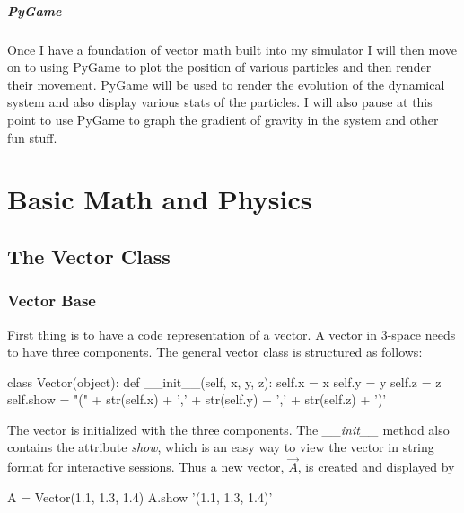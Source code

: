 \documentclass[15pt]{report}
\begin{document}
\indent \paragraph{PyGame} Once I have a foundation of vector math built into my simulator I will then move on to using PyGame to plot the position of various particles and then render their movement. PyGame will be used to render the evolution of the dynamical system and also display various stats of the particles. I will also pause at this point to use PyGame to graph the gradient of gravity in the system and other fun stuff.



\chapter{Basic Math and Physics}

\section{The Vector Class} \label{vectors}
\subsection{Vector Base} First thing is to have a code representation of a vector. A vector in 3-space needs to have three components. The general vector class is structured as follows:

\begin{code}

class Vector(object):
    def __init__(self, x, y, z):
        self.x = x
        self.y = y
        self.z = z
        self.show = "(" + str(self.x) + ',' + str(self.y) + ',' + str(self.z) + ')'
           

\end{code}

The vector is initialized with the three components. The \textit{\_\_init\_\_} method also contains the attribute \textit{show}, which is an easy way to view the vector in string format for interactive sessions. Thus a new vector, $\vec{A}$, is created and displayed by

\begin{code}
A = Vector(1.1, 1.3, 1.4)
A.show
'(1.1, 1.3, 1.4)'
\end{code}
\end{document}
